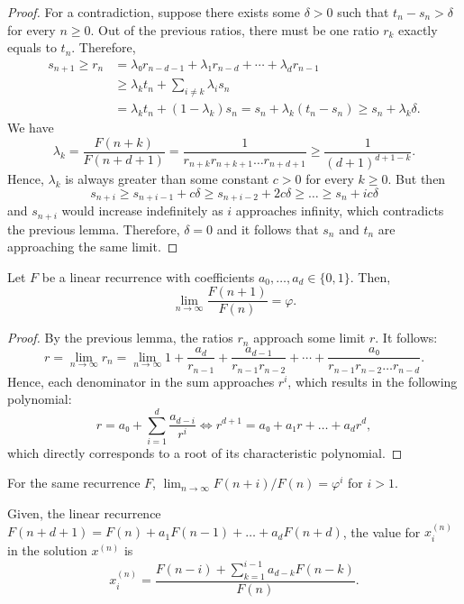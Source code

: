 \begin{proof}
  For a contradiction, suppose there exists some $δ > 0$ such that $t_n - s_n > δ$ for every $n ≥ 0$.
  Out of the previous ratios, there must be one ratio $r_k$ exactly equals to $t_n$.
  Therefore,
  \begin{align*}
    s_{n+1} ≥ r_n & = λ₀ r_{n-d-1} + λ₁ r_{n-d} + ⋯ + λ_d r_{n-1} \\
                  & ≥ λ_k t_n + \sum_{i ≠ k} λ_i s_n \\
                  & = λ_k t_n + (1 - λ_k) s_n = s_n + λ_k (t_n - s_n) ≥ s_n + λ_k δ.
  \end{align*}
  We have
  \[
    λ_k = \frac{F(n+k)}{F(n+d+1)} = \frac{1}{r_{n+k} r_{n+k+1} \dots r_{n+d+1}} ≥ \frac{1}{(d+1)^{d+1-k}}.
  \]
  Hence, $λ_k$ is always greater than some constant $c > 0$ for every $k ≥ 0$.
  But then
  \[
    s_{n+i} ≥ s_{n+i-1} + c δ ≥ s_{n+i-2} + 2c δ ≥ \dots ≥ s_n + i c δ
  \]
  and $s_{n+i}$ would increase indefinitely as $i$ approaches infinity,
  which contradicts the previous lemma.
  Therefore, $δ = 0$ and it follows that $s_n$ and $t_n$ are approaching the same limit.
\end{proof}

\begin{theorem}
  Let $F$ be a linear recurrence with coefficients $a_0, \dots, a_d ∈ \{0,1\}$.
  Then,
  \[
    \lim_{n \to \infty} \frac{F(n + 1)}{F(n)} = φ.
  \]
\end{theorem}

\begin{proof}
  By the previous lemma, the ratios $r_n$ approach some limit $r$. It follows:
  \[
    r
    = \lim_{n → ∞} r_n
    = \lim_{n → ∞} 1 + \frac{a_d}{r_{n-1}} + \frac{a_{d-1}}{r_{n-1} r_{n-2}} + ⋯ + \frac{a₀}{r_{n-1} r_{n-2} \dots r_{n-d}}.
  \]
  Hence, each denominator in the sum approaches $r^i$,
  which results in the following polynomial:
  \[
    r = a₀ + \sum_{i = 1}^d \frac{a_{d - i}}{r^i}
    \iff
    r^{d+1} = a₀ + a₁ r + \dots + a_d r^d,
  \]
  which directly corresponds to a root of its characteristic polynomial.
\end{proof}

\begin{corollary}
  For the same recurrence $F$, $\lim_{n → ∞} F(n + i) / F(n) = φ^i$ for $i > 1$.
\end{corollary}

Given, the linear recurrence $F(n + d + 1) = F(n) + a_1 F(n - 1) + \dots + a_d F(n + d)$,
the value for $x_i^{(n)}$ in the solution $x^{(n)}$ is
\begin{equation}
  \label{eq:general-solution}
  x_i^{(n)} = \frac{F(n - i) + \sum_{k=1}^{i-1} a_{d-k} F(n - k)}{F(n)}.
\end{equation}

